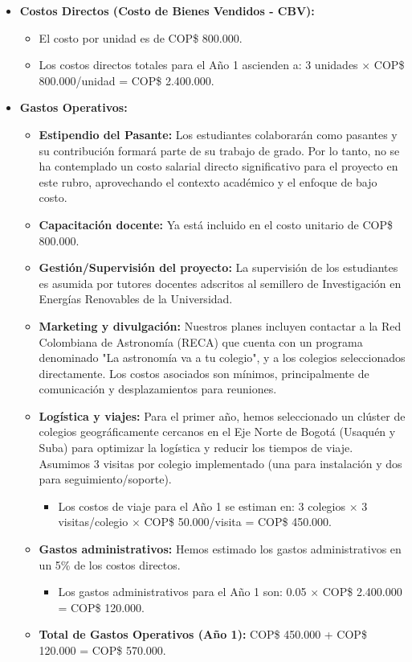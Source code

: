 \begin{itemize}
    \item \textbf{Costos Directos (Costo de Bienes Vendidos - CBV):}
    \begin{itemize}
        \item El costo por unidad es de COP\$ 800.000.
        \item Los costos directos totales para el Año 1 ascienden a: 
					3 unidades $\times$ COP\$ 800.000/unidad = COP\$ 2.400.000.
    \end{itemize}
    \item \textbf{Gastos Operativos:}
    \begin{itemize}
        \item \textbf{Estipendio del Pasante:} Los estudiantes colaborarán como 
					pasantes y su contribución formará parte de su trabajo de grado. Por 
					lo tanto, no se ha contemplado un costo salarial directo 
					significativo para el proyecto en este rubro, aprovechando el 
					contexto académico y el enfoque de bajo costo.
        \item \textbf{Capacitación docente:} Ya está incluido en el costo 
					unitario de COP\$ 800.000.
        \item \textbf{Gestión/Supervisión del proyecto:} La supervisión de los 
					estudiantes es asumida por tutores docentes adscritos al semillero de 
					Investigación en Energías Renovables de la Universidad.
        \item \textbf{Marketing y divulgación:} Nuestros planes incluyen 
					contactar a la Red Colombiana de Astronomía (RECA) que cuenta con un 
					programa denominado "La astronomía va a tu colegio", y a los colegios 
					seleccionados directamente. Los costos asociados son mínimos, 
					principalmente de comunicación y desplazamientos para reuniones.
        \item \textbf{Logística y viajes:} Para el primer año, hemos 
					seleccionado un clúster de colegios geográficamente cercanos en el 
					Eje Norte de Bogotá (Usaquén y Suba) para optimizar la logística y 
					reducir los tiempos de viaje. Asumimos 3 visitas por colegio 
					implementado (una para instalación y dos para seguimiento/soporte).
        \begin{itemize}
            \item Los costos de viaje para el Año 1 se estiman en: 
							3 colegios $\times$ 3 visitas/colegio $\times$ 
							COP\$ 50.000/visita = COP\$ 450.000.
        \end{itemize}
        \item \textbf{Gastos administrativos:} Hemos estimado los gastos 
					administrativos en un 5\% de los costos directos.
        \begin{itemize}
            \item Los gastos administrativos para el Año 1 son: 
							0.05 $\times$ COP\$ 2.400.000 = COP\$ 120.000.
        \end{itemize}
        \item \textbf{Total de Gastos Operativos (Año 1):} 
					COP\$ 450.000 + COP\$ 120.000 = COP\$ 570.000.
    \end{itemize}
\end{itemize}

